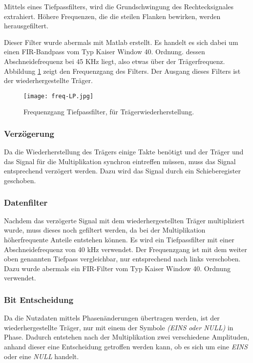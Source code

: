 Mittels eines Tiefpassfilters, wird die Grundschwingung des Rechtecksignales extrahiert. Höhere Frequenzen, die die steilen Flanken bewirken, werden herausgefiltert.

Dieser Filter wurde abermals mit Matlab erstellt. Es handelt es sich dabei um einen FIR-Bandpass vom Typ Kaiser Window  40. Ordnung. dessen Abschneidefrequenz  bei 45 KHz liegt, also etwas über der Trägerfrequenz. Abbildung \ref{fig:freq-lp} zeigt den Frequenzgang des Filters. Der Ausgang dieses Filters ist der wiederhergestellte Träger.

\begin{figure}[H]
\centering
\texttt{[image: freq-LP.jpg]}
\caption{Frequenzgang Tiefpassfilter, für Trägerwiederherstellung.}
\label{fig:freq-lp}
\end{figure}

\subsubsection*{Verzögerung}
Da die Wiederherstellung des Trägers einige Takte benötigt und der Träger und das Signal für die Multiplikation synchron eintreffen müssen, muss das Signal entsprechend verzögert werden. Dazu wird das Signal durch ein Schieberegister geschoben.

\subsubsection*{Datenfilter}
Nachdem das verzögerte Signal mit dem wiederhergestellten Träger multipliziert wurde, muss dieses noch gefiltert werden, da bei der Multiplikation höherfrequente Anteile entstehen können. Es wird ein Tiefpassfilter mit einer Abschneidefrequenz von 40 kHz verwendet. Der Frequenzgang ist mit dem weiter oben genannten Tiefpass vergleichbar, nur entsprechend nach links verschoben. Dazu wurde abermals ein FIR-Filter vom Typ Kaiser Window 40. Ordnung verwendet.

\subsubsection*{Bit Entscheidung}
Da die Nutzdaten mittels Phasenänderungen übertragen werden, ist der wiederhergestellte Träger, nur mit einem der Symbole \emph{(EINS oder NULL)} in Phase. Dadurch entstehen nach der Multiplikation zwei verschiedene Amplituden, anhand dieser eine Entscheidung getroffen werden kann, ob es sich um eine \emph{EINS} oder eine \emph{NULL} handelt.

